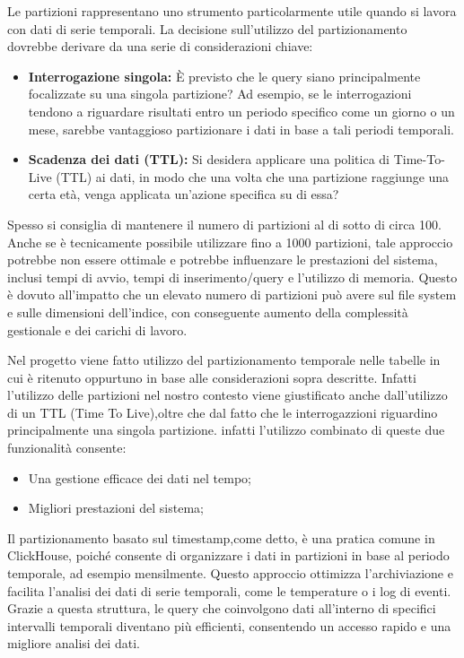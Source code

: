Le partizioni rappresentano uno strumento particolarmente utile quando si lavora con dati di serie temporali. La decisione sull'utilizzo del partizionamento dovrebbe derivare da una serie di considerazioni chiave:
\begin{itemize}
  \item \textbf{Interrogazione singola:} È previsto che le query siano principalmente focalizzate su una singola partizione? Ad esempio, se le interrogazioni tendono a riguardare risultati entro un periodo specifico come un giorno o un mese, sarebbe vantaggioso partizionare i dati in base a tali periodi temporali.
  \item \textbf{Scadenza dei dati (TTL):} Si desidera applicare una politica di Time-To-Live (TTL) ai dati, in modo che una volta che una partizione raggiunge una certa età, venga applicata un'azione specifica su di essa?
\end{itemize}

Spesso si consiglia di mantenere il numero di partizioni al di sotto di circa 100. Anche se è tecnicamente possibile utilizzare fino a 1000 partizioni, tale approccio potrebbe non essere ottimale e potrebbe influenzare le prestazioni del sistema, inclusi tempi di avvio, tempi di inserimento/query e l'utilizzo di memoria. Questo è dovuto all'impatto che un elevato numero di partizioni può avere sul file system e sulle dimensioni dell'indice, con conseguente aumento della complessità gestionale e dei carichi di lavoro.

Nel progetto viene fatto utilizzo del partizionamento temporale nelle tabelle in cui è ritenuto oppurtuno in base alle considerazioni sopra descritte.
Infatti l'utilizzo delle partizioni nel nostro contesto viene giustificato anche dall'utilizzo di un TTL (Time To Live),oltre che dal fatto che le interrogazzioni riguardino principalmente una singola partizione. infatti l'utilizzo combinato di queste due funzionalità consente:
\begin{itemize}
    \item Una gestione efficace dei dati nel tempo;
    \item Migliori prestazioni del sistema;
\end{itemize}

Il partizionamento basato sul timestamp,come detto, è una pratica comune in ClickHouse, poiché consente di organizzare i dati in partizioni in base al periodo temporale, ad esempio mensilmente. Questo approccio ottimizza l'archiviazione e facilita l'analisi dei dati di serie temporali, come le temperature o i log di eventi. Grazie a questa struttura, le query che coinvolgono dati all'interno di specifici intervalli temporali diventano più efficienti, consentendo un accesso rapido e una migliore analisi dei dati.
    
